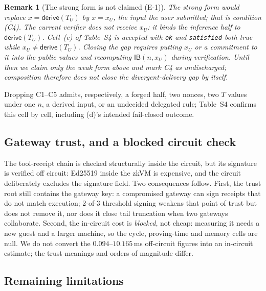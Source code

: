 \documentclass[10pt,journal,compsoc]{IEEEtran}
\newtheorem{remark}[theorem]{Remark}
\newcommand{\need}[1]{}
\newcommand{\need}[1]{\textcolor{blue}{[[ NEED: #1 ]]}}
\begin{document}
\begin{remark}[The strong form is not claimed (E-1)]
\label{rem:e1}
The strong form would replace $x=\mathsf{derive}(T_U)$ by $x=x_U$, the input the
user submitted; that is condition (C4). The current verifier does not receive
$x_U$: it binds the inference half to $\mathsf{derive}(T_U)$. Cell~(c) of
Table~S4 is accepted with \texttt{ok} and \texttt{satisfied} both true while
$x_U\neq\mathsf{derive}(T_U)$. Closing the gap requires putting $x_U$ or a
commitment to it into the public values and recomputing
$\mathsf{IB}(n,x_U)$ during verification. Until then we claim only the weak form
above and mark C4 as undischarged; composition therefore does not close the
divergent-delivery gap by itself.
\end{remark}

Dropping C1--C5 admits, respectively, a forged half, two nonces, two $T$ values
under one $n$, a derived input, or an undecided delegated rule; Table~S4
confirms this cell by cell, including (d)'s intended fail-closed outcome.

\need{BLOCKER WP4-(2)/WP3 (external resources): real-model scale
($\ge10^6$ parameters) and composition cost data are not measured. The claim
that composition cost is dominated by inference proving is \emph{unverified} at
proxy scale (\texttt{bench/results/compose.md}) and is not made here.}

\subsection{Gateway trust, and a blocked circuit check}
\label{sec:disc-gateway}

The tool-receipt chain is checked structurally inside the circuit, but its
signature is verified off circuit: Ed25519 inside the zkVM is expensive, and the
circuit deliberately excludes the signature field. Two consequences follow.
First, the trust root still contains the gateway key: a compromised gateway can
sign receipts that do not match execution; 2-of-3 threshold signing weakens that
point of trust but does not remove it, nor does it close tail truncation when two
gateways collaborate. Second, the in-circuit cost is \emph{blocked}, not cheap:
measuring it needs a new guest and a larger machine, so the cycle, proving-time
and memory cells are null. We do not convert the
$0.094$--$10.165$\,ms off-circuit figures into an in-circuit estimate; the trust
meanings and orders of magnitude differ.

\subsection{Remaining limitations}
\label{sec:disc-rest}
\end{document}
